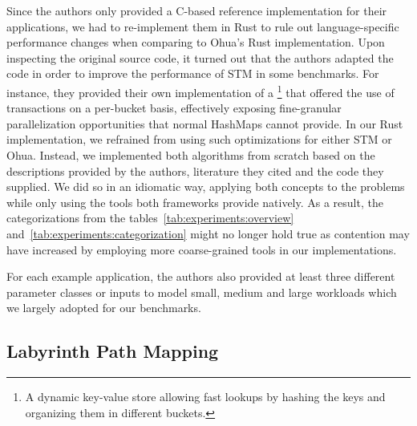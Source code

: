 Since the authors only provided a C-based reference implementation for their applications, we had to re-implement them in Rust to rule out language-specific performance changes when comparing to Ohua's Rust implementation.
Upon inspecting the original source code, it turned out that the authors adapted the code in order to improve the performance of STM in some benchmarks.
For instance, they provided their own implementation of a \footnote{A dynamic key-value store allowing fast lookups by hashing the keys and organizing them in different buckets.} that offered the use of transactions on a per-bucket basis, effectively exposing fine-granular parallelization opportunities that normal HashMaps cannot provide.
In our Rust implementation, we refrained from using such optimizations for either STM or Ohua.
Instead, we implemented both algorithms from scratch based on the descriptions provided by the authors, literature they cited and the code they supplied.
We did so in an idiomatic way, applying both concepts to the problems while only using the tools both frameworks provide natively.
As a result, the categorizations from the tables~\ref{tab:experiments:overview} and~\ref{tab:experiments:categorization} might no longer hold true as contention may have increased by employing more coarse-grained tools in our implementations.

For each example application, the authors also provided at least three different parameter classes or inputs to model small, medium and large workloads which we largely adopted for our benchmarks.



\subsection{Labyrinth Path Mapping}
\label{sec:experiments:labyrinth}

